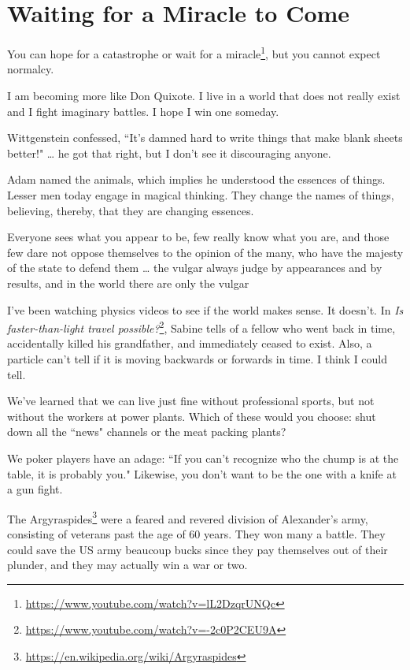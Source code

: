 \section{Waiting for a Miracle to Come}

You can hope for a catastrophe or wait for a miracle\footnote{\url{https://www.youtube.com/watch?v=lL2DzqrUNQc}}, but you cannot expect normalcy.

I am becoming more like Don Quixote. I live in a world that does not really exist and I fight imaginary battles. I hope I win one someday.

Wittgenstein confessed, ``It's damned hard to write things that make blank sheets better!" … he got that right, but I don't see it discouraging anyone.

Adam named the animals, which implies he understood the essences of things. Lesser men today engage in magical thinking. They change the names of things, believing, thereby, that they are changing essences.

\begin{quotex}
Everyone sees what you appear to be, few really know what you are, and those few dare not oppose themselves to the opinion of the many, who have the majesty of the state to defend them … the vulgar always judge by appearances and by results, and in the world there are only the vulgar 

\end{quotex}
I've been watching physics videos to see if the world makes sense. It doesn't. In \textit{Is faster-than-light travel possible?}\footnote{\url{https://www.youtube.com/watch?v=-2c0P2CEU9A}}, Sabine tells of a fellow who went back in time, accidentally killed his grandfather, and immediately ceased to exist. Also, a particle can't tell if it is moving backwards or forwards in time. I think I could tell.

We've learned that we can live just fine without professional sports, but not without the workers at power plants. Which of these would you choose: shut down all the ``news" channels or the meat packing plants?

We poker players have an adage: ``If you can't recognize who the chump is at the table, it is probably you." Likewise, you don't want to be the one with a knife at a gun fight.

The Argyraspides\footnote{\url{https://en.wikipedia.org/wiki/Argyraspides}} were a feared and revered division of Alexander's army, consisting of veterans past the age of 60 years. They won many a battle. They could save the US army beaucoup bucks since they pay themselves out of their plunder, and they may actually win a war or two.

